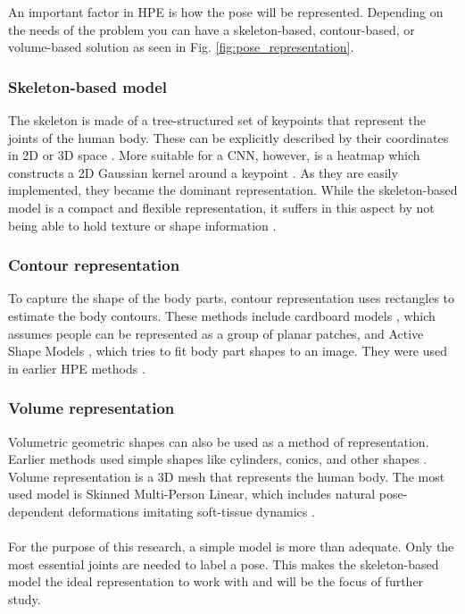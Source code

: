 An important factor in HPE is how the pose will be represented.
Depending on the needs of the problem you can have a skeleton-based, contour-based, or volume-based solution \cite{Chen2000} as seen in Fig. \ref{fig:pose_representation}.

\subsubsection{Skeleton-based model}
The skeleton is made of a tree-structured set of keypoints that represent the joints of the human body.
These can be explicitly described by their coordinates in 2D or 3D space \cite{Toshev2014}.
More suitable for a CNN, however, is a heatmap which constructs a 2D Gaussian kernel around a keypoint \cite{Liu2104, SWARH}.
As they are easily implemented, they became the dominant representation.
While the skeleton-based model is a compact and flexible representation, it suffers in this aspect by not being able to hold texture or shape information \cite{Zheng2012}.

\subsubsection{Contour representation}
To capture the shape of the body parts, contour representation uses rectangles to estimate the body contours.
These methods include cardboard models \cite{Ju96}, which assumes people can be represented as a group of planar patches, and Active Shape Models \cite{COOTES95}, which tries to fit body part shapes to an image.
They were used in earlier HPE methods \cite{Chen2000}.

\subsubsection{Volume representation}
Volumetric geometric shapes can also be used as a method of representation.
Earlier methods used simple shapes like cylinders, conics, and other shapes \cite{Sidenbladh2000}.
Volume representation is a 3D mesh that represents the human body.
The most used model is Skinned Multi-Person Linear, which includes natural pose-dependent deformations imitating soft-tissue dynamics \cite{Loper2015}.  
\\
\\
For the purpose of this research, a simple model is more than adequate.
Only the most essential joints are needed to label a pose.
This makes the skeleton-based model the ideal representation to work with and will be the focus of further study.

